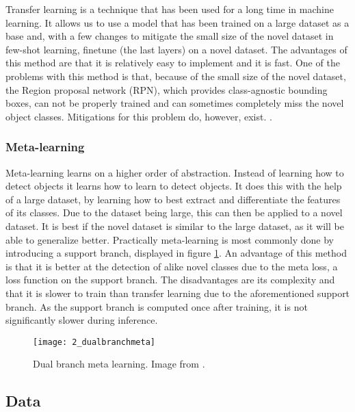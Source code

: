 Transfer learning is a technique that has been used for a long time in machine learning. It allows us to use a model that has been trained on a large dataset as a base and, with a few changes to mitigate the small size of the novel dataset in few-shot learning, finetune (the last layers) on a novel dataset. The advantages of this method are that it is relatively easy to implement and it is fast. One of the problems with this method is that, because of the small size of the novel dataset, the Region proposal network (RPN), which provides class-agnostic bounding boxes, can not be properly trained and can sometimes completely miss the novel object classes. Mitigations for this problem do, however, exist. \cite{DBLP:journals/corr/abs-2011-10142, VU2022104398, DBLP:journals/corr/abs-2105-09491, DBLP:journals/corr/abs-2103-05950,rs14143255}.

\subsubsection*{Meta-learning}

Meta-learning learns on a higher order of abstraction. Instead of learning how to detect objects it learns how to learn to detect objects. It does this with the help of a large dataset, by learning how to best extract and differentiate the features of its classes. Due to the dataset being large, this can then be applied to a novel dataset. It is best if the novel dataset is similar to the large dataset, as it will be able to generalize better. Practically meta-learning is most commonly done by introducing a support branch\cite{few-shot-comprehensive-survey}, displayed in figure \ref{fig:2_dualbranchmeta}. An advantage of this method is that it is better at the detection of alike novel classes due to the meta loss, a loss function on the support branch. %
The disadvantages are its complexity and that it is slower to train than transfer learning due to the aforementioned support branch. As the support branch is computed once after training, it is not significantly slower during inference.

\begin{figure}[H]
	\centering
	\texttt{[image: 2\_dualbranchmeta]}
	\caption{\label{fig:2_dualbranchmeta} Dual branch meta learning. Image from \citet{few-shot-comprehensive-survey}.}
\end{figure}

\subsection{Data}


